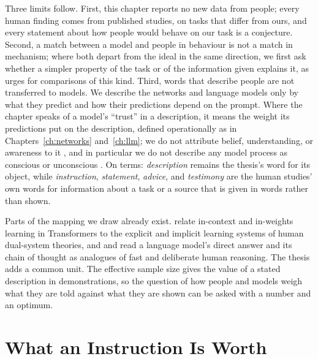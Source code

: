 Three limits follow. First, this chapter reports no new data from people; every human finding comes from published studies, on tasks that differ from ours, and every statement about how people would behave on our task is a conjecture. Second, a match between a model and people in behaviour is not a match in mechanism; where both depart from the ideal in the same direction, we first ask whether a simpler property of the task or of the information given explains it, as \citet{frank2023} urges for comparisons of this kind. Third, words that describe people are not transferred to models. We describe the networks and language models only by what they predict and how their predictions depend on the prompt. Where the chapter speaks of a model's ``trust'' in a description, it means the weight its predictions put on the description, defined operationally as in Chapters~\ref{ch:networks} and~\ref{ch:llm}; we do not attribute belief, understanding, or awareness to it \citep{shiffrin2023}, and in particular we do not describe any model process as conscious or unconscious \citep{butlin2023}. On terms: \emph{description} remains the thesis's word for its object, while \emph{instruction}, \emph{statement}, \emph{advice}, and \emph{testimony} are the human studies' own words for information about a task or a source that is given in words rather than shown.

Parts of the mapping we draw already exist. \citet{russin2025} relate in-context and in-weights learning in Transformers to the explicit and implicit learning systems of human dual-system theories, and \citet{hagendorff2023} and \citet{lampinen2024content} read a language model's direct answer and its chain of thought as analogues of fast and deliberate human reasoning. The thesis adds a common unit. The effective sample size gives the value of a stated description in demonstrations, so the question of how people and models weigh what they are told against what they are shown can be asked with a number and an optimum.

\section{What an Instruction Is Worth}\label{sec:hl-worth}

